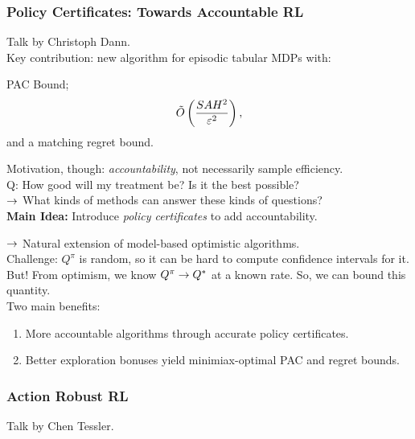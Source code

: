 \spacerule

\subsubsection{Policy Certificates: Towards Accountable RL~\cite{dann2018policy}}

Talk by Christoph Dann. \\

Key contribution: new algorithm for episodic tabular MDPs with:
\begin{theorem}
PAC Bound;
\[
\tilde{O}\left(\frac{SAH^2}{\varepsilon^2}\right),
\]
and a matching regret bound.
\end{theorem}

Motivation, though: {\it accountability}, not necessarily sample efficiency. \\

Q: How good will my treatment be? Is it the best possible? \\
$\rightarrow$ What kinds of methods can answer these kinds of questions?  \\

{\bf Main Idea:} Introduce {\it policy certificates} to add accountability.

$\rightarrow$ Natural extension of model-based optimistic algorithms. \\

Challenge: $Q^\pi$ is random, so it can be hard to compute confidence intervals for it. But! From optimism, we know $Q^\pi \rightarrow Q^*$ at a known rate. So, we can bound this quantity. \\

Two main benefits:
\begin{enumerate}
    \item More accountable algorithms through accurate policy certificates.
    \item Better exploration bonuses yield minimiax-optimal PAC and regret bounds.
\end{enumerate}

\spacerule

\subsubsection{Action Robust RL~\cite{tessler2019action}}


Talk by Chen Tessler. \\

